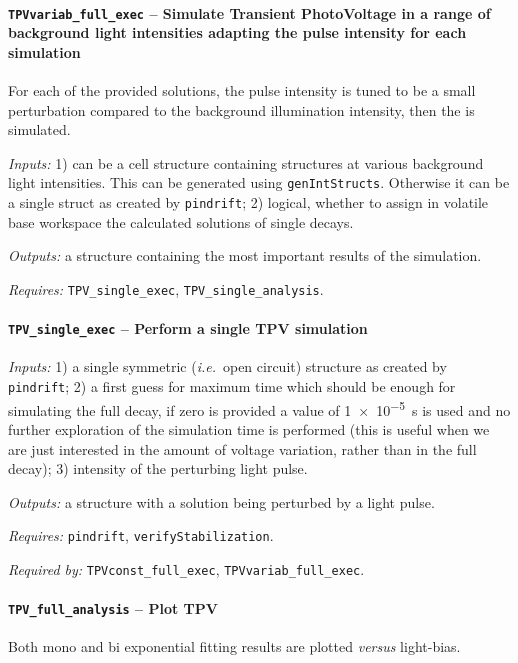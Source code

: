 		\paragraph{\texttt{TPV\-variab\_full\_exec} -- Simulate Transient PhotoVoltage in a range of background light intensities adapting the pulse intensity for each simulation}
		For each of the provided solutions, the pulse intensity is tuned to be a small perturbation compared to the background illumination intensity, then the  is simulated.

		\textit{Inputs:} 1) can be a cell structure containing structures at various background
		light intensities. This can be generated using \texttt{gen\-Int\-Structs}.
		Otherwise it can be a single struct as created by \texttt{pin\-drift};
		2) logical, whether to assign in volatile base
		workspace the calculated solutions of single  decays.

		\textit{Outputs:} a structure containing the most important results of the simulation.

		\textit{Requires:} \texttt{TPV\_single\_exec}, \texttt{TPV\_single\_analysis}.


		\paragraph{\texttt{TPV\_single\_exec} -- Perform a single TPV simulation}

		\textit{Inputs:} 1) a single symmetric (\textsl{i.e.}\ open circuit) structure as created by \texttt{pin\-drift};
		2) a first guess for maximum time which should be enough for simulating the full decay, if zero is provided a value of \SI{1e-5}{\s} is used and no further exploration of the simulation time is performed (this is useful when we are just interested in the amount of voltage variation, rather than in the full decay);
		3) intensity of the perturbing light pulse.

		\textit{Outputs:} a structure with a solution being perturbed by a light pulse.

		\textit{Requires:} \texttt{pin\-drift}, \texttt{verify\-Stabilization}.

		\textit{Required by:} \texttt{TPV\-const\_full\_exec}, \texttt{TPV\-variab\_full\_exec}.


		\paragraph{\texttt{TPV\_full\_analysis} -- Plot TPV}
		Both mono and bi exponential fitting results are plotted \textsl{versus} light-bias.

